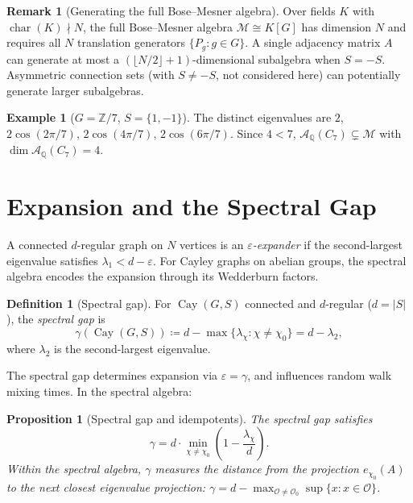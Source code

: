 \documentclass[12pt]{amsart}
\numberwithin{equation}{section}
\theoremstyle{plain}
\newtheorem{proposition}[theorem]{Proposition}
\theoremstyle{definition}
\newtheorem{definition}[theorem]{Definition}
\newtheorem{example}[theorem]{Example}
\newtheorem{remark}[theorem]{Remark}
\DeclareMathOperator{\ch}{char}
\DeclareMathOperator{\Cay}{Cay}
\newcommand{\Z}{\mathbb{Z}}
\newcommand{\Q}{\mathbb{Q}}
\newcommand{\calA}{\mathcal{A}}
\newcommand{\calO}{\mathcal{O}}
\begin{document}
\begin{remark}[Generating the full Bose--Mesner algebra]
Over fields $K$ with $\ch(K) \nmid N$, the full Bose--Mesner algebra
$\mathcal{M} \cong K[G]$ has dimension $N$ and requires all $N$
translation generators $\{P_g : g \in G\}$.  A single adjacency matrix $A$
can generate at most a $({\lfloor N/2 \rfloor + 1})$-dimensional subalgebra
when $S = -S$.  Asymmetric connection sets (with $S \ne -S$, not considered
here) can potentially generate larger subalgebras.
\end{remark}

\begin{example}[$G = \Z/7$, $S = \{1,-1\}$]
The distinct eigenvalues are $2$, $2\cos(2\pi/7)$,
$2\cos(4\pi/7)$, $2\cos(6\pi/7)$.  Since $4 < 7$,
$\calA_\Q(C_7) \subsetneq \mathcal{M}$ with
$\dim \calA_\Q(C_7) = 4$.
\end{example}

\section{Expansion and the Spectral Gap}
\label{sec:expansion}

A connected $d$-regular graph on $N$ vertices is an \emph{$\varepsilon$-expander}
if the second-largest eigenvalue satisfies $\lambda_1 < d - \varepsilon$.
For Cayley graphs on abelian groups, the spectral algebra encodes the
expansion through its Wedderburn factors.

\begin{definition}[Spectral gap]
For $\Cay(G,S)$ connected and $d$-regular ($d = |S|$), the
\emph{spectral gap} is
\[
  \gamma(\Cay(G,S))
  \coloneqq d - \max\!\bigl\{\lambda_\chi : \chi \ne \chi_0\bigr\}
  = d - \lambda_2,
\]
where $\lambda_2$ is the second-largest eigenvalue.
\end{definition}

The spectral gap determines expansion via $\varepsilon = \gamma$, and
influences random walk mixing times.  In the spectral algebra:

\begin{proposition}[Spectral gap and idempotents]
\label{prop:spectral-gap}
The spectral gap satisfies
\[
  \gamma = d \cdot \min_{\chi \ne \chi_0}
  \left(1 - \frac{\lambda_\chi}{d}\right).
\]
Within the spectral algebra, $\gamma$ measures the distance from the
projection $e_{\chi_0}(A)$ to the next closest eigenvalue projection:
$\gamma = d - \max_{\calO \ne \calO_0} \sup\{x : x \in \calO\}$.
\end{proposition}
\end{document}
